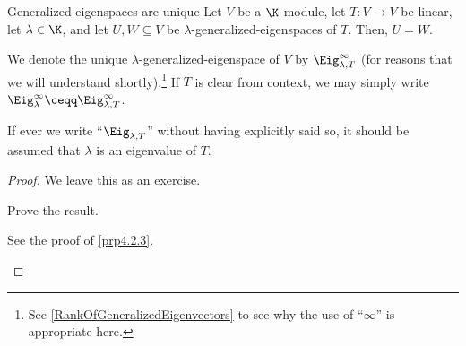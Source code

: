 \begin{prp}{Generalized-eigenspaces are unique}{}
	Let $V$ be a $\K$-module, let $T\colon V\rightarrow V$ be linear, let $\lambda \in \K$, and let $U,W\subseteq V$ be $\lambda$-generalized-eigenspaces of $T$.  Then, $U=W$.
	\begin{rmk}
		We denote the unique $\lambda$-generalized-eigenspace of $V$ by $\Eig _{\lambda ,T}^{\infty}$ (for reasons that we will understand shortly).\footnote{See \cref{RankOfGeneralizedEigenvectors} to see why the use of ``$\infty$'' is appropriate here.}  If $T$ is clear from context, we may simply write $\Eig _{\lambda}^{\infty}\ceqq \Eig _{\lambda ,T}^{\infty}$\index[notation]{$\Eig _{\lambda}^{\infty}$}.
	\end{rmk}
	\begin{rmk}
		If ever we write ``$\Eig _{\lambda ,T}$'' without having explicitly said so, it should be assumed that $\lambda$ is an eigenvalue of $T$.
	\end{rmk}
	\begin{proof}
		We leave this as an exercise.
		\begin{exr}[breakable=false]{}{}
			Prove the result.
			\begin{rmk}
				See the proof of \cref{prp4.2.3}.
			\end{rmk}
		\end{exr}
	\end{proof}
\end{prp}
